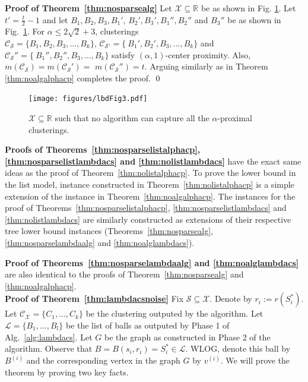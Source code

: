 \documentclass[letterpaper,12pt,titlepage,oneside,final]{book}
\newcommand{\mc}{\mathcal}
\begin{document}
\noindent\textbf{Proof of Theorem~\ref{thm:nosparsealg}}
Let $\mc X \subseteq \mathbb{R}$ be as shown in Fig. \ref{fig:nosparsealg}. Let $t' = \frac{t}{2}-1$ and let $B_1, B_2, B_3, B_1'$, $B_2', B_3', B_1'', B_2''$ and $B_3''$ be as shown in Fig.~\ref{fig:nosparsealg}. For $\alpha \le 2\sqrt{2}+3$, clusterings \\$\mc C_{\mc S} = \{B_1, B_2, B_3, \ldots, B_k\}$, $\mc C_{\mc S'} = \{\ B_1', B_2', B_3, \ldots, B_k\}$ and $\mc C_{\mc S}'' = \{\ B_1'', B_2'', B_3, \ldots, B_k\}$ satisfy $(\alpha, 1)$-center proximity. Also, $m(\mc C_{\mc S}) = m(\mc C_{\mc S}') =$ $m(\mc C_{\mc S}'') = t$. Arguing similarly as in Theorem \ref{thm:noalgalphacp} completes the proof. \qed\\
\begin{figure}[!t]
\begin{center}
\texttt{[image: figures/lbdFig3.pdf]}
\end{center}
\caption{$\mc X \subseteq \mathbb{R}$ such that no algorithm can capture all the $\alpha$-proximal clusterings. } 
\label{fig:nosparsealg}
\end{figure}

\noindent\textbf{Proofs of Theorems~\ref{thm:nosparselistalphacp}, \ref{thm:nosparselistlambdacs} and \ref{thm:nolistlambdacs}} have the exact same ideas as the proof of Theorem~\ref{thm:nolistalphacp}. To prove the lower bound in the list model, instance constructed in Theorem~\ref{thm:nolistalphacp} is a simple extension of the instance in Theorem~\ref{thm:noalgalphacp}. The instances for the proof of Theorems~\ref{thm:nosparselistalphacp}, \ref{thm:nosparselistlambdacs} and \ref{thm:nolistlambdacs} are similarly constructed as extensions of their respective tree lower bound instances (Theorems~\ref{thm:nosparsealg}, \ref{thm:nosparselambdaalg} and \ref{thm:noalglambdacs}).

\noindent\textbf{Proof of Theorems~\ref{thm:nosparselambdaalg} and \ref{thm:noalglambdacs}} are also identical to the proofs of Theorem~\ref{thm:nosparsealg} and \ref{thm:noalgalphacp}.\\

\noindent\textbf{Proof of Theorem~\ref{thm:lambdacsnoise}}
Fix $\mc S \subseteq \mc X$. Denote by $r_i := r(S_i^*)$. Let $\mc C_{\mc X} = \{C_1, \ldots, C_k\}$ be the clustering outputed by the algorithm. Let $\mc L = \{B_1, \ldots, B_l\}$ be the list of balls as outputed by Phase 1 of Alg.~\ref{alg:lambdacs}. Let $G$ be the graph as constructed in Phase 2 of the algorithm. Observe that $B = B(s_i, r_i) = S_i^* \in \mc L$. WLOG, denote this ball by $B^{(i)}$ and the corresponding vertex in the graph $G$ by $v^{(i)}$. We will prove the theorem by proving two key facts.  
\end{document}
